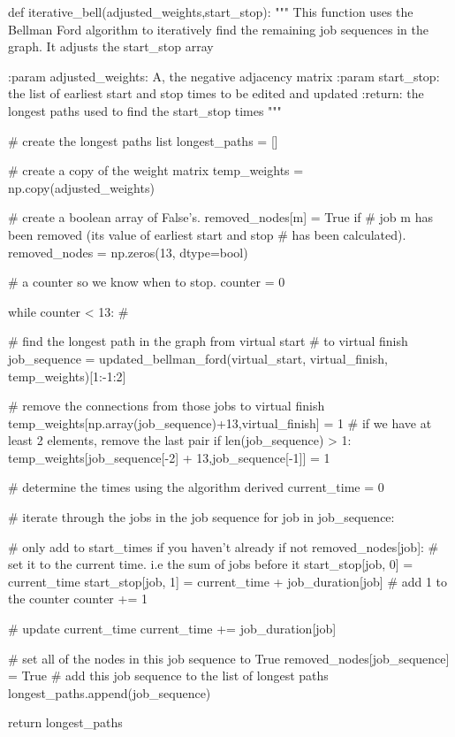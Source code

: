 \documentclass[paper=a4, fontsize=12pt]{scrartcl} %
\numberwithin{equation}{section}       %
\numberwithin{figure}{section}         %
\numberwithin{table}{section}          %
\begin{document}
\begin{python}
def iterative_bell(adjusted_weights,start_stop):
    """
    This function uses the Bellman Ford algorithm to iteratively find
    the remaining job sequences in the graph. It adjusts the start_stop
    array

    :param adjusted_weights: A, the negative adjacency matrix
    :param start_stop: the list of earliest start and stop times to be
    edited and updated
    :return: the longest paths used to find the start_stop times
    """

    # create the longest paths list
    longest_paths = []

    # create a copy of the weight matrix
    temp_weights = np.copy(adjusted_weights)

    # create a boolean array of False's. removed_nodes[m] = True if
    # job m has been removed (its value of earliest start and stop
    # has been calculated).
    removed_nodes = np.zeros(13, dtype=bool)

    # a counter so we know when to stop.
    counter = 0

    while counter < 13:  #

        # find the longest path in the graph from virtual start
        # to virtual finish
        job_sequence = updated_bellman_ford(virtual_start,
                                            virtual_finish,
                                            temp_weights)[1:-1:2]

        # remove the connections from those jobs to virtual finish
        temp_weights[np.array(job_sequence)+13,virtual_finish] = 1
        # if we have at least 2 elements, remove the last pair
        if len(job_sequence) > 1:
            temp_weights[job_sequence[-2] + 13,job_sequence[-1]] = 1

        # determine the times using the algorithm derived
        current_time = 0  

        # iterate through the jobs in the job sequence
        for job in job_sequence:  

            # only add to start_times if you haven't already
            if not removed_nodes[job]:  
                # set it to the current time. i.e the sum of jobs before it
                start_stop[job, 0] = current_time  
                start_stop[job, 1] = current_time + job_duration[job]
                # add 1 to the counter
                counter += 1  

            # update current_time
            current_time += job_duration[job]  

        # set all of the nodes in this job sequence to True
        removed_nodes[job_sequence] = True  
        # add this job sequence to the list of longest paths
        longest_paths.append(job_sequence)
        
    return longest_paths
\end{python}
\end{document}
